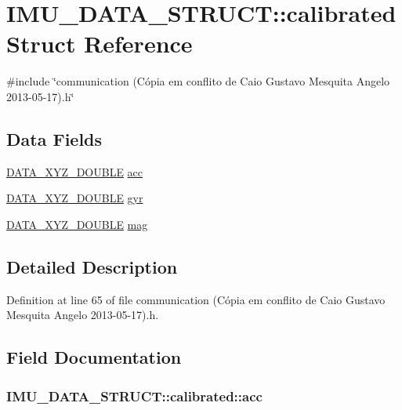 \hypertarget{structIMU__DATA__STRUCT_1_1calibrated}{\section{I\-M\-U\-\_\-\-D\-A\-T\-A\-\_\-\-S\-T\-R\-U\-C\-T\-:\-:calibrated Struct Reference}
\label{structIMU__DATA__STRUCT_1_1calibrated}
}


{\ttfamily \#include \char`\"{}communication (\-Cópia em conflito de Caio Gustavo Mesquita Angelo 2013-\/05-\/17).\-h\char`\"{}}

\subsection*{Data Fields}
\begin{DoxyCompactItemize}
\item 
\hyperlink{structDATA__XYZ__DOUBLE}{D\-A\-T\-A\-\_\-\-X\-Y\-Z\-\_\-\-D\-O\-U\-B\-L\-E} \hyperlink{structIMU__DATA__STRUCT_1_1calibrated_a281a7fdb40a05ed97388f18b9bb90c81}{acc}
\item 
\hyperlink{structDATA__XYZ__DOUBLE}{D\-A\-T\-A\-\_\-\-X\-Y\-Z\-\_\-\-D\-O\-U\-B\-L\-E} \hyperlink{structIMU__DATA__STRUCT_1_1calibrated_a8a54aded6ce608f1b7d2b4a0c52c248b}{gyr}
\item 
\hyperlink{structDATA__XYZ__DOUBLE}{D\-A\-T\-A\-\_\-\-X\-Y\-Z\-\_\-\-D\-O\-U\-B\-L\-E} \hyperlink{structIMU__DATA__STRUCT_1_1calibrated_a2fde6c6759e0fda17e272c32096cb9ec}{mag}
\end{DoxyCompactItemize}


\subsection{Detailed Description}


Definition at line 65 of file communication (\-Cópia em conflito de Caio Gustavo Mesquita Angelo 2013-\/05-\/17).\-h.



\subsection{Field Documentation}
\hypertarget{structIMU__DATA__STRUCT_1_1calibrated_a281a7fdb40a05ed97388f18b9bb90c81}{
\subsubsection[{acc}]{ I\-M\-U\-\_\-\-D\-A\-T\-A\-\_\-\-S\-T\-R\-U\-C\-T\-::calibrated\-::acc}}\label{structIMU__DATA__STRUCT_1_1calibrated_a281a7fdb40a05ed97388f18b9bb90c81}


